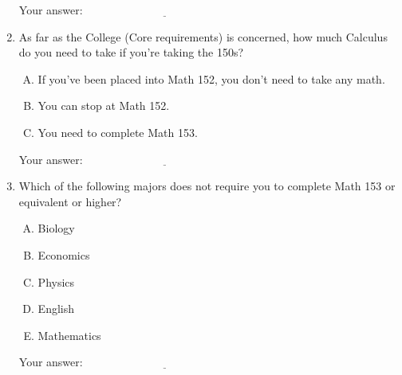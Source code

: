 \documentclass[10pt]{amsart}
\begin{document}
\begin{enumerate}
  \vspace{0.1in}
  Your answer: $\underline{\qquad\qquad\qquad\qquad\qquad\qquad\qquad}$
  \vspace{0.1in}

\item As far as the College (Core requirements) is concerned, how much
  Calculus do you need to take if you're taking the 150s?

  \begin{enumerate}[(A)]
  \item If you've been placed into Math 152, you don't need to take any math.
  \item You can stop at Math 152.
  \item You need to complete Math 153.
  \end{enumerate}

  \vspace{0.1in}
  Your answer: $\underline{\qquad\qquad\qquad\qquad\qquad\qquad\qquad}$
  \vspace{0.1in}

\item Which of the following majors does not require you to complete
  Math 153 or equivalent or higher?

  \begin{enumerate}[(A)]
  \item Biology
  \item Economics
  \item Physics
  \item English
  \item Mathematics
  \end{enumerate}

  \vspace{0.1in}
  Your answer: $\underline{\qquad\qquad\qquad\qquad\qquad\qquad\qquad}$
  \vspace{0.1in}

\end{enumerate}
\end{document}
